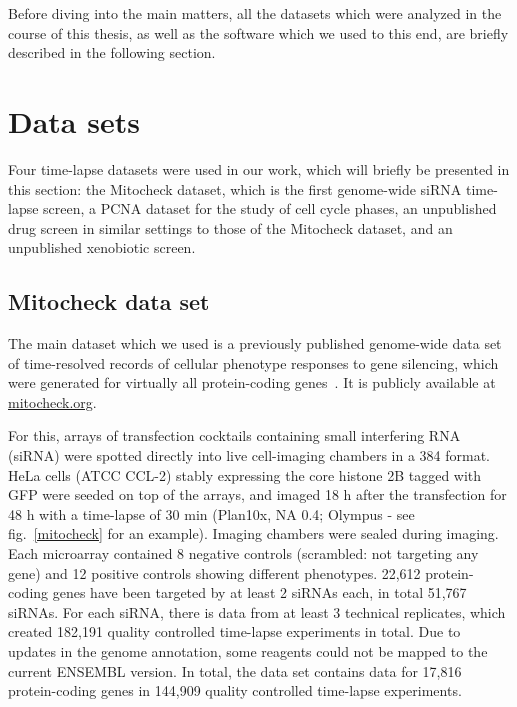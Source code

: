 Before diving into the main matters, all the datasets which were analyzed in the course of this thesis, as well as the software which we used to this end, are briefly described in the following section.
%
%
\section{Data sets}
Four time-lapse datasets were used in our work, which will briefly be presented in this section: the Mitocheck dataset, which is the first genome-wide siRNA time-lapse screen, a PCNA dataset for the study of cell cycle phases, an unpublished drug screen in similar settings to those of the Mitocheck dataset, and an unpublished xenobiotic screen.

\subsection{Mitocheck data set}
\label{sec:mito_prez}
The main dataset which we used is a previously published genome-wide data set of time-resolved
records of cellular phenotype responses to gene silencing, which
were generated for virtually all protein-coding genes~\cite{pmid20360735}. It is publicly available at
\href{http://www.mitocheck.org}{mitocheck.org}. 

For this, arrays of transfection cocktails containing small interfering RNA (siRNA) were spotted directly into live cell-imaging chambers in a 384 format. HeLa cells (ATCC\up{\textregistered} CCL-2\texttrademark) stably expressing the core histone 2B tagged with GFP were seeded on top of the arrays, and imaged 18 h after the transfection for 48 h with a time-lapse of 30 min (Plan10x, NA 0.4; Olympus - see fig.~\ref{mitocheck} for an example). Imaging chambers were sealed during imaging. Each microarray contained 8 negative controls (scrambled: not targeting any gene) and 12 positive controls showing different phenotypes. 
22,612 protein-coding genes have been targeted by at least 2 siRNAs each, in total 51,767 siRNAs. For each siRNA, there is data from at least 3 technical replicates, which created 182,191 quality controlled time-lapse experiments in total. Due to updates in the genome annotation, some reagents could not be mapped to the current ENSEMBL version. In total, the data set contains data for 17,816 protein-coding genes in 144,909 quality controlled time-lapse
experiments.  

